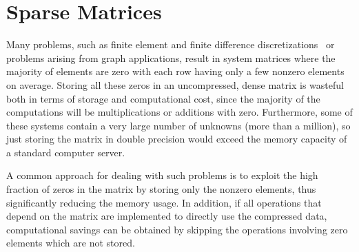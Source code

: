 \section{Sparse Matrices}
\label{introduction:sec:sparse}

Many problems, such as finite element and finite difference
discretizations~\cite{saad,duff} or problems arising from graph applications,
result in system matrices where the majority of elements are zero with
each row having only a few nonzero elements on average. Storing all these zeros
in an uncompressed, dense matrix is wasteful both in terms of storage and
computational cost, since the majority of the computations will be
multiplications or additions with zero. Furthermore, some of these systems
contain a very large number of unknowns (more than a million), so just storing
the matrix in double precision would exceed the memory capacity of a standard
computer server.

A common approach for dealing with such problems is to exploit the high fraction
of zeros in the matrix by storing only the nonzero elements, thus significantly
reducing the memory usage. In addition, if all operations that depend on the
matrix are implemented to directly use the compressed data, computational
savings can be obtained by skipping the operations involving zero elements
which are not stored.

